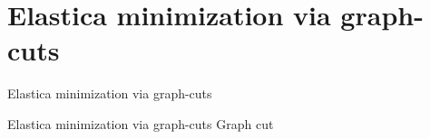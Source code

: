 \section{Elastica minimization via graph-cuts}

\begin{frame}
\huge
Elastica minimization via graph-cuts
\end{frame}

\begin{frame}
{Elastica minimization via graph-cuts}
{Graph cut}
\center
{}%
%
%
\end{frame}

